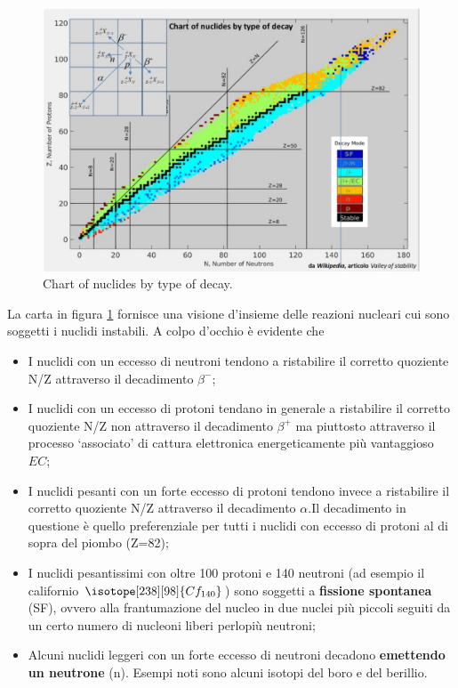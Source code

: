 \begin{figure}
    \centering
    \includegraphics{../figs/nuclides-chart-decay}
    \caption{Chart of nuclides by type of decay.}
    \label{fig:nuclides-chart-decay}
\end{figure}

La carta in figura \ref{fig:nuclides-chart-decay} fornisce una visione d’insieme delle reazioni nucleari cui sono
soggetti i nuclidi instabili.
A colpo d’occhio è evidente che
\begin{itemize}
    \item I nuclidi con un eccesso di neutroni tendono a ristabilire il corretto quoziente N/Z
    attraverso il decadimento $ \beta^-$;
    \item I nuclidi con un eccesso di protoni tendano in generale a ristabilire il corretto quoziente N/Z non attraverso
    il decadimento $ \beta^+$ ma piuttosto attraverso il processo ‘associato’ di cattura elettronica energeticamente più
    vantaggioso $EC$;
    \item I nuclidi pesanti con un forte eccesso di protoni tendono invece a ristabilire il corretto quoziente N/Z
    attraverso il decadimento $ \alpha$.Il decadimento in questione è quello preferenziale per tutti i nuclidi con
    eccesso di protoni al di sopra del piombo (Z=82);
    \item I nuclidi pesantissimi con oltre 100 protoni e 140 neutroni (ad esempio il californio $ \isotope[238][98]{\mathlarger{Cf}_{140}}$)
    sono soggetti a \textbf{fissione spontanea} (SF), ovvero alla frantumazione del nucleo in due nuclei più piccoli seguiti
    da un certo numero di nucleoni liberi perlopiù neutroni;
    \item Alcuni nuclidi leggeri con un forte eccesso di neutroni decadono \textbf{emettendo un neutrone} (n).
    Esempi noti sono alcuni isotopi del boro e del berillio.
\end{itemize}

